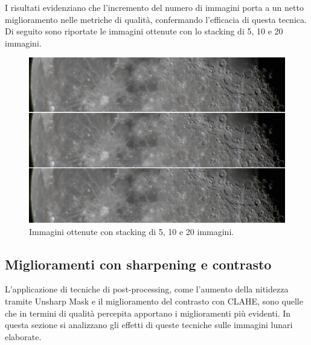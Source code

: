 \begin{figure}[H]
\end{figure}

I risultati evidenziano che l'incremento del numero di immagini porta a un netto miglioramento nelle metriche di qualità, confermando l'efficacia di questa tecnica. Di seguito sono riportate le immagini ottenute con lo stacking di 5, 10 e 20 immagini.

\begin{figure}[H]
    \centering
    \includegraphics[width = \linewidth]{../assets/n_stack_img.png}
    \caption{Immagini ottenute con stacking di 5, 10 e 20 immagini.}
    \label{fig:n_stack_img}
\end{figure}

\subsection{Miglioramenti con sharpening e contrasto} \label{subsec:analysis_post}

L'applicazione di tecniche di post-processing, come l'aumento della nitidezza tramite Unsharp Mask e il miglioramento del contrasto con CLAHE, sono quelle che in termini di qualità percepita apportano i miglioramenti più evidenti. In questa sezione si analizzano gli effetti di queste tecniche sulle immagini lunari elaborate.

